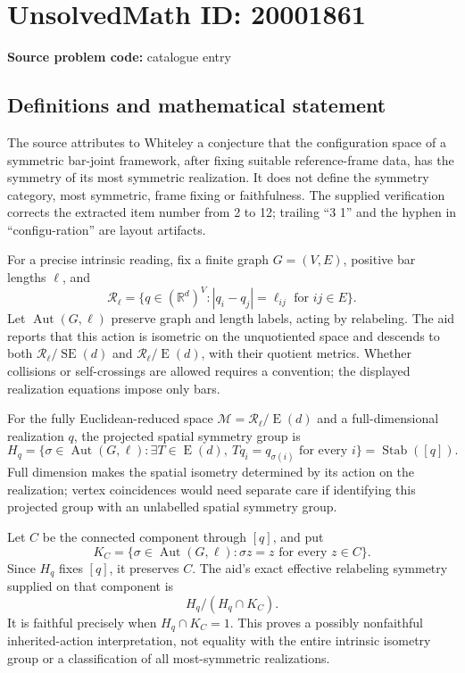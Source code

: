 \documentclass[11pt]{article}
\newcommand{\R}{\mathbb{R}}
\begin{document}
\section*{UnsolvedMath ID: 20001861}
\textbf{Source problem code:} catalogue entry
\subsection{Definitions and mathematical statement}
The source attributes to Whiteley a conjecture that the configuration space of a symmetric bar-joint framework, after fixing suitable reference-frame data, has the symmetry of its most symmetric realization. It does not define the symmetry category, most symmetric, frame fixing or faithfulness. The supplied verification corrects the extracted item number from 2 to 12; trailing ``3 1'' and the hyphen in ``configu-ration'' are layout artifacts.

For a precise intrinsic reading, fix a finite graph \(G=(V,E)\), positive bar lengths \(\ell\), and
\[
 \mathcal R_\ell=\{q\in(\R^d)^V:|q_i-q_j|=\ell_{ij}\text{ for }ij\in E\}.
\]
Let \(\operatorname{Aut}(G,\ell)\) preserve graph and length labels, acting by relabeling. The aid reports that this action is isometric on the unquotiented space and descends to both \(\mathcal R_\ell/\operatorname{SE}(d)\) and \(\mathcal R_\ell/\operatorname{E}(d)\), with their quotient metrics. Whether collisions or self-crossings are allowed requires a convention; the displayed realization equations impose only bars.

For the fully Euclidean-reduced space \(\mathcal M=\mathcal R_\ell/\operatorname{E}(d)\) and a full-dimensional realization \(q\), the projected spatial symmetry group is
\[
 H_q=\{\sigma\in\operatorname{Aut}(G,\ell):
 \exists T\in\operatorname{E}(d),\ Tq_i=q_{\sigma(i)}\text{ for every }i\}
 =\operatorname{Stab}([q]).
\]
Full dimension makes the spatial isometry determined by its action on the realization; vertex coincidences would need separate care if identifying this projected group with an unlabelled spatial symmetry group.

Let \(C\) be the connected component through \([q]\), and put
\[
 K_C=\{\sigma\in\operatorname{Aut}(G,\ell):
 \sigma z=z\text{ for every }z\in C\}.
\]
Since \(H_q\) fixes \([q]\), it preserves \(C\). The aid's exact effective relabeling symmetry supplied on that component is
\[
 H_q/(H_q\cap K_C).
\]
It is faithful precisely when \(H_q\cap K_C=1\). This proves a possibly nonfaithful inherited-action interpretation, not equality with the entire intrinsic isometry group or a classification of all most-symmetric realizations.
\end{document}
